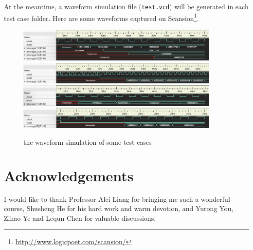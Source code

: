 \documentclass{article}
\begin{document}
At the meantime, a waveform simulation file (\texttt{test.vcd}) will be generated in each test case folder. Here are some waveforms captured on Scansion\footnote{\url{http://www.logicpoet.com/scansion/}}.
\begin{figure}[!h]
\begin{center}
\includegraphics[width=0.9\textwidth]{image/test-logic}
\includegraphics[width=0.9\textwidth]{image/test-jump}
\includegraphics[width=0.9\textwidth]{image/test-stall}
\includegraphics[width=0.9\textwidth]{image/test-forwarding}
\caption{the waveform simulation of some test cases}
\end{center}
\end{figure}


\section{Acknowledgements}
I would like to thank Professor Alei Liang for bringing me such a wonderful course, Shusheng He for his hard work and warm devotion, and Yurong You, Zihao Ye and Lequn Chen for valuable discussions.
\end{document}
